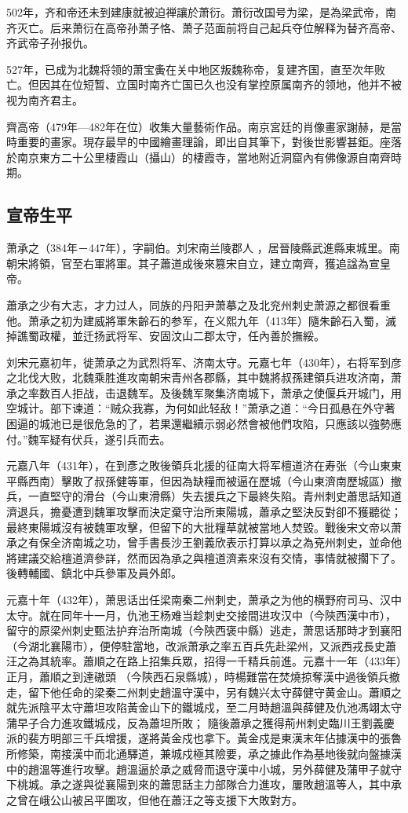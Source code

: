502年，齐和帝还未到建康就被迫禅讓於萧衍。萧衍改国号为梁，是為梁武帝，南齐灭亡。后来萧衍在高帝孙萧子恪、萧子范面前将自己起兵夺位解释为替齐高帝、齐武帝子孙报仇。

527年，已成为北魏将领的萧宝夤在关中地区叛魏称帝，复建齐国，直至次年败亡。但因其在位短暂、立国时南齐亡国已久也没有掌控原属南齐的领地，他并不被视为南齐君主。

齊高帝（479年—482年在位）收集大量藝術作品。南京宮廷的肖像畫家謝赫，是當時重要的畫家。現存最早的中國繪畫理論，即出自其筆下，對後世影響甚鉅。座落於南京東方二十公里棲霞山（攝山）的棲霞寺，當地附近洞窟內有佛像源自南齊時期。

\subsection{宣帝生平}

萧承之（384年－447年），字嗣伯。刘宋南兰陵郡人 ，居晉陵縣武進縣東城里。南朝宋將領，官至右軍將軍。其子蕭道成後來篡宋自立，建立南齊，獲追諡為宣皇帝。

蕭承之少有大志，才力过人，同族的丹阳尹萧摹之及北兖州刺史萧源之都很看重他。萧承之初为建威將軍朱齡石的参军，在义熙九年（413年）隨朱齡石入蜀，滅掉譙蜀政權，並迁扬武将军、安固汶山二郡太守，任內善於撫綏。

刘宋元嘉初年，徙萧承之为武烈将军、济南太守。元嘉七年（430年），右将军到彦之北伐大败，北魏乘胜進攻南朝宋青州各郡縣，其中魏將叔孫建領兵进攻济南，萧承之率数百人拒战，击退魏军。及後魏军聚集济南城下，萧承之使偃兵开城门，用空城计。部下谏道：“贼众我寡，为何如此轻敌！”萧承之道：“今日孤悬在外守著困逼的城池已是很危急的了，若果還繼續示弱必然會被他們攻陷，只應該以強勢應付。”魏军疑有伏兵，遂引兵而去。

元嘉八年（431年），在到彥之敗後領兵北援的征南大将军檀道济在寿张（今山東東平縣西南）擊敗了叔孫健等軍，但因為缺糧而被逼在歷城（今山東濟南歷城區）撤兵，一直堅守的滑台（今山東滑縣）失去援兵之下最終失陷。青州刺史蕭思話知道濟退兵，擔憂遭到魏軍攻擊而決定棄守治所東陽城，蕭承之堅決反對卻不獲聽從；最終東陽城沒有被魏軍攻擊，但留下的大批糧草就被當地人焚毀。戰後宋文帝以萧承之有保全济南城之功，曾手書長沙王劉義欣表示打算以承之為兗州刺史，並命他將建議交給檀道濟參詳，然而因為承之與檀道濟素來沒有交情，事情就被擱下了。後轉輔國、鎮北中兵參軍及員外郎。

元嘉十年（432年），萧思话出任梁南秦二州刺史，萧承之为他的横野府司马、汉中太守。就在同年十一月，仇池王杨难当趁刺史交接間进攻汉中（今陝西漢中市），留守的原梁州刺史甄法护弃治所南城（今陝西褒中縣）逃走，萧思话那時才到襄阳（今湖北襄陽市），便停駐當地，改派萧承之率五百兵先赴梁州，又派西戎長史蕭汪之為其統率。蕭順之在路上招集兵眾，招得一千精兵前進。元嘉十一年（433年）正月，蕭順之到達磝頭 （今陝西石泉縣城），時楊難當在焚燒掠奪漢中過後領兵撤走，留下他任命的梁秦二州刺史趙溫守漢中，另有魏兴太守薛健守黄金山。蕭順之就先派陰平太守蕭坦攻陷黃金山下的鐵城戍，至二月時趙溫與薛健及仇池馮翊太守蒲早子合力進攻鐵城戍，反為蕭坦所敗； 隨後蕭承之獲得荊州刺史臨川王劉義慶派的裴方明部三千兵增援，遂將黃金戍也拿下。黃金戍是東漢末年佔據漢中的張魯所修築，南接漢中而北通驛道，兼城戍極其險要，承之據此作為基地後就向盤據漢中的趙溫等進行攻擊。趙溫逼於承之威脅而退守漢中小城，另外薛健及蒲甲子就守下桃城。承之遂與從襄陽到來的蕭思話主力部隊合力進攻，屢敗趙溫等人，其中承之曾在峨公山被呂平圍攻，但他在蕭汪之等支援下大敗對方。

